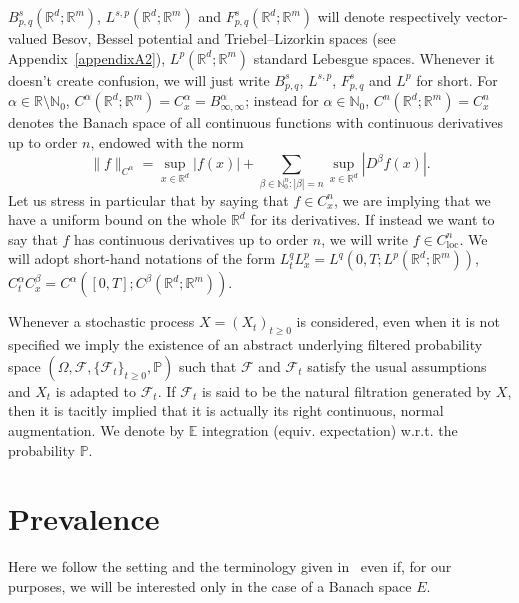 \documentclass[10pt]{article}
\newcommand{\tmop}[1]{\ensuremath{\operatorname{#1}}}
\begin{document}
$B^s_{p, q} (\mathbb{R}^d ; \mathbb{R}^m)$, $L^{s, p} (\mathbb{R}^d ;
\mathbb{R}^m)$ and $F^s_{p, q} (\mathbb{R}^d ; \mathbb{R}^m)$ will denote
respectively vector\mbox{-}valued Besov, Bessel potential and
Triebel--Lizorkin spaces (see Appendix~\ref{appendixA2}), $L^p (\mathbb{R}^d ;
\mathbb{R}^m)$ standard Lebesgue spaces. Whenever it doesn't create confusion,
we will just write $B^s_{p, q}$, $L^{s, p}$, $F^s_{p, q}$ and $L^p$ for short.
For $\alpha \in \mathbb{R} \setminus \mathbb{N}_0$, $C^{\alpha} (\mathbb{R}^d
; \mathbb{R}^m) = C^{\alpha}_x = B^{\alpha}_{\infty, \infty}$; instead for
$\alpha \in \mathbb{N}_0$, $C^n (\mathbb{R}^d ; \mathbb{R}^m) = C^n_x$ denotes
the Banach space of all continuous functions with continuous derivatives up to
order $n$, endowed with the norm
\[ \| f \|_{C^{\alpha}} = \sup_{x \in \mathbb{R}^d} | f (x) | + \sum_{\beta
   \in \mathbb{N}_0^n : | \beta | = n} \sup_{x \in \mathbb{R}^d} | D^{\beta} f
   (x) | . \]
Let us stress in particular that by saying that $f \in C^n_x$, we are implying
that we have a uniform bound on the whole $\mathbb{R}^d$ for its derivatives.
If instead we want to say that $f$ has continuous derivatives up to order $n$,
we will write $f \in C^n_{\tmop{loc}}$. We will adopt short-hand notations of
the form $L^q_t L^p_x = L^q (0, T ; L^p (\mathbb{R}^d ; \mathbb{R}^m))$,
$C^{\alpha}_t C^{\beta}_x = C^{\alpha} ([0, T] ; C^{\beta} (\mathbb{R}^d ;
\mathbb{R}^m))$.

Whenever a stochastic process $X = (X_t)_{t \geqslant 0}$ is considered, even
when it is not specified we imply the existence of an abstract underlying
filtered probability space $(\Omega, \mathcal{F}, \{ \mathcal{F}_t \}_{t
\geqslant 0}, \mathbb{P})$ such that $\mathcal{F}$ and $\mathcal{F}_t$ satisfy
the usual assumptions and $X_t$ is adapted to $\mathcal{F}_t$. If
$\mathcal{F}_t$ is said to be the natural filtration generated by $X$, then it
is tacitly implied that it is actually its right continuous, normal
augmentation. We denote by $\mathbb{E}$ integration (equiv. expectation)
w.r.t. the probability $\mathbb{P}$.

\section{Prevalence}\label{sec2}

Here we follow the setting and the terminology given in~{\cite{huntsauer}}
even if, for our purposes, we will be interested only in the case of a Banach
space $E$.
\end{document}
